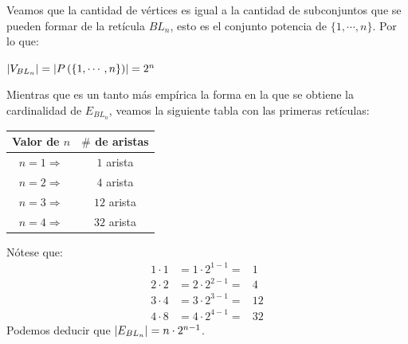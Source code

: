 \documentclass{article}
\begin{document}
\begin{enumerate}
\begin{enumerate}
        Veamos que la cantidad de v\'ertices es igual a la
        cantidad de subconjuntos que se pueden formar de
        la ret\'icula $BL_n$, esto es el conjunto potencia
        de $\{1, \dotsm, n\}$. Por lo que:
        \begin{center}
          $\abs{V_{BL_n}} = \abs{P \left(\{1, \dotsm, n\}\right)} = 2^{n}$
        \end{center}
        Mientras que es un tanto m\'as emp\'irica la forma en
        la que se obtiene la cardinalidad de $E_{BL_n}$,
        veamos la siguiente tabla con las primeras ret\'iculas:
        \begin{center}
          \begin{tabular}{|c|c|}
            \hline
            Valor de $n$ & $\#$ de aristas \\
            \hline
            $n = 1 \Rightarrow$ & $1$ arista \\
            \hline
            $n = 2 \Rightarrow$ & $4$ arista \\
            \hline
            $n = 3 \Rightarrow$ & $12$ arista \\
            \hline
            $n = 4 \Rightarrow$ & $32$ arista \\
            \hline
          \end{tabular}
        \end{center}
        N\'otese que:
        \begin{eqnarray*}
          1 \cdot 1 &= 1 \cdot 2^{1-1} =& 1\\
          2 \cdot 2 &= 2 \cdot 2^{2-1} =& 4\\
          3 \cdot 4 &= 3 \cdot 2^{3-1} =& 12\\
          4 \cdot 8 &= 4 \cdot 2^{4-1} =& 32
        \end{eqnarray*}
        Podemos deducir que $\abs{E_{BL_n}} = n \cdot 2^{n-1}$.

        \begin{center}
        \end{center}


\end{enumerate}
\end{enumerate}
\end{document}
